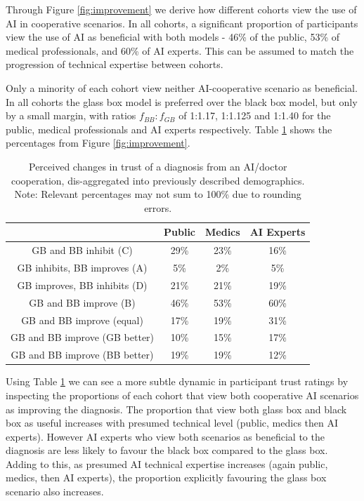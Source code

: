 \documentclass[manuscript,screen,review]{acmart}
\begin{document}
Through Figure \ref{fig:improvement} we derive how different cohorts view the use of AI in cooperative scenarios. In all cohorts, a significant proportion of participants view the use of AI as beneficial with both models - 46\% of the public, 53\% of medical professionals, and 60\% of AI experts. This can be assumed to match the progression of technical expertise between cohorts.

Only a minority of each cohort view neither AI-cooperative scenario as beneficial. In all cohorts the glass box model is preferred over the black box model, but only by a small margin, with ratios $f_{BB}:f_{GB}$ of 1:1.17, 1:1.125 and 1:1.40 for the public, medical professionals and AI experts respectively. Table \ref{tab:demographic_trust_change} shows the percentages from Figure \ref{fig:improvement}.

\begin{table}[h]
\begin{tabular}{c||c|c|c}
     & Public & Medics & AI Experts \\
     \hline \hline
    GB and BB inhibit (C)            & 29\% & 23\% & 16\%\\ \hline
    GB inhibits, BB improves (A)     & 5\%  & 2\%  & 5\% \\
    GB improves, BB inhibits (D)     & 21\% & 21\% & 19\%\\  \hline
    GB and BB improve (B)            & 46\% & 53\% & 60\%\\ \hline
    GB and BB improve (equal)        & 17\% & 19\% & 31\%\\
    GB and BB improve (GB better)    & 10\% & 15\% & 17\%\\
    GB and BB improve (BB better)    & 19\% & 19\% & 12\%\\ 
\end{tabular}
\caption{\label{tab:demographic_trust_change}Perceived changes in trust of a diagnosis from an AI/doctor cooperation, dis-aggregated into previously described demographics. Note: Relevant percentages may not sum to 100\% due to rounding errors.}
\end{table}

Using Table \ref{tab:demographic_trust_change} we can see a more subtle dynamic in participant trust ratings by inspecting the proportions of each cohort that view both cooperative AI scenarios as improving the diagnosis. The proportion that view both glass box and black box as useful increases with presumed technical level (public, medics then AI experts). However AI experts who view both scenarios as beneficial to the diagnosis are less likely to favour the black box compared to the glass box. Adding to this, as presumed AI technical expertise increases (again public, medics, then AI experts), the proportion explicitly favouring the glass box scenario also increases.
\end{document}
